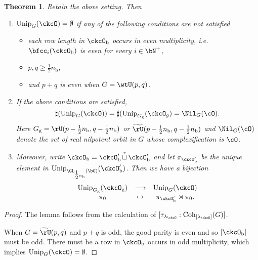 \documentclass[12pt,a4paper]{amsart}
\def\abs#1{\left|{#1}\right|}
\numberwithin{equation}{section}
\newtheorem{thm}{Theorem}[section]
\theoremstyle{remark}
\def\half{{\tfrac{1}{2}}}
\def\Unip{\mathrm{Unip}}
\def\lamck{\lambda_\ckcO}
\def\Cint#1{\Coh_{[#1]}}
\def\nbb{n_{\mathrm b}}
\def\tU{\widetilde{\rU}}
\def\Coh{\mathrm{Coh}}
\def\cuprow{{\stackrel{r}{\sqcup}}}
\def\cuprow{{\,\stackrel{r}{\sqcup}\,}}
\def\ckcOb{\ckcO_{\mathrm b}}
\def\ckcOpb{\ckcO'_{\mathrm b}}
\def\ckcOg{\ckcO_{\mathrm g}}
\def\Gg{G_{\mathrm g}}
\begin{document}
\begin{thm}
  Retain the above setting. Then
  \begin{enumerate}[label=(\alph*)]
    \item $\Unip_{G}(\ckcO)= \emptyset$ if any of the following conditions are
          not satisfied
          \begin{itemize}
            \item each row length in $\ckcOb$ occurs in even multiplicity, i.e.
                  $\bfcc_{i}(\ckcOb)$ is even for every $i\in \bN^{+}$,
            \item $p,q \geq \half \nbb$,
            \item and $p+q$ is even when $G = \wtU(p,q)$.
          \end{itemize}
    \item If the above conditions are satisfied,
          \[
          \sharp(\Unip_{G}(\ckcO)) = \sharp(\Unip_{\Gg}(\ckcO_{g}) = \Nil_{G}(\cO).
          \]
          Here $\Gg = \rU(p-\half \nbb,q-\half \nbb)$ or
          $\tU(p-\half \nbb,q-\half \nbb)$ and $\Nil_{G}(\cO)$ denote the set of
          real nilpotent orbit in $G$ whose complexification is $\cO$.
    \item Moreover, write $\ckcOb = \ckcOpb\cuprow \ckcOpb$ and let
          $\pi_{\ckcOpb}$ be the unique element in
          $\Unip_{\GL_{\half\nbb}(\bC)}(\ckcOpb)$. Then we have a bijection
          \[
          \begin{array}{ccc}
            \Unip_{\Gg}(\ckcOg) &\longrightarrow & \Unip_{G}(\ckcO)\\
            \pi_{0}& \mapsto & \pi_{\ckcOpb}\rtimes \pi_{0}. \\
          \end{array}
          \]
  \end{enumerate}
\end{thm}
\begin{proof}
  The lemma follows from the calculation of $[\tau_{\lamck}:\Cint{\lamck}(G)]$.

  When $G = \tU(p,q)$ and $p+q$ is odd, the good parity is even and so
  $\abs{\ckcOb}$ must be odd. There must be a row in $\ckcOb$ occurs in
  odd multiplicity, which implies $\Unip_{G}(\ckcO)=\emptyset$.
\end{proof}
\end{document}
